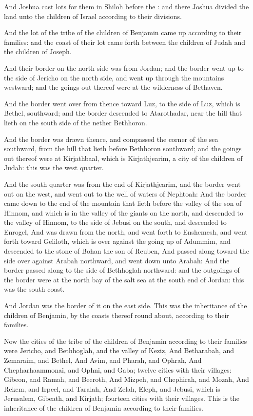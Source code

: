 \Verse And Joshua cast lots for them in Shiloh before the \LORD: and there Joshua divided the land unto the children of Israel according to their divisions.

\Verse And the lot of the tribe of the children of Benjamin came up according to their families: and the coast of their lot came forth between the children of Judah and the children of Joseph.

\Verse And their border on the north side was from Jordan; and the border went up to the side of Jericho on the north side, and went up through the mountains westward; and the goings out thereof were at the wilderness of Bethaven.

\Verse And the border went over from thence toward Luz, to the side of Luz, which is Bethel, southward; and the border descended to Atarothadar, near the hill that lieth on the south side of the nether Bethhoron.

\Verse And the border was drawn thence, and compassed the corner of the sea southward, from the hill that lieth before Bethhoron southward; and the goings out thereof were at Kirjathbaal, which is Kirjathjearim, a city of the children of Judah: this was the west quarter.

\Verse And the south quarter was from the end of Kirjathjearim, and the border went out on the west, and went out to the well of waters of Nephtoah: \Verse And the border came down to the end of the mountain that lieth before the valley of the son of Hinnom, and which is in the valley of the giants on the north, and descended to the valley of Hinnom, to the side of Jebusi on the south, and descended to Enrogel, \Verse And was drawn from the north, and went forth to Enshemesh, and went forth toward Geliloth, which is over against the going up of Adummim, and descended to the stone of Bohan the son of Reuben, \Verse And passed along toward the side over against Arabah northward, and went down unto Arabah: \Verse And the border passed along to the side of Bethhoglah northward: and the outgoings of the border were at the north bay of the salt sea at the south end of Jordan: this was the south coast.

\Verse And Jordan was the border of it on the east side. This was the inheritance of the children of Benjamin, by the coasts thereof round about, according to their families.

\Verse Now the cities of the tribe of the children of Benjamin according to their families were Jericho, and Bethhoglah, and the valley of Keziz, \Verse And Betharabah, and Zemaraim, and Bethel, \Verse And Avim, and Pharah, and Ophrah, \Verse And Chepharhaammonai, and Ophni, and Gaba; twelve cities with their villages: \Verse Gibeon, and Ramah, and Beeroth, \Verse And Mizpeh, and Chephirah, and Mozah, \Verse And Rekem, and Irpeel, and Taralah, \Verse And Zelah, Eleph, and Jebusi, which is Jerusalem, Gibeath, and Kirjath; fourteen cities with their villages. This is the inheritance of the children of Benjamin according to their families.


